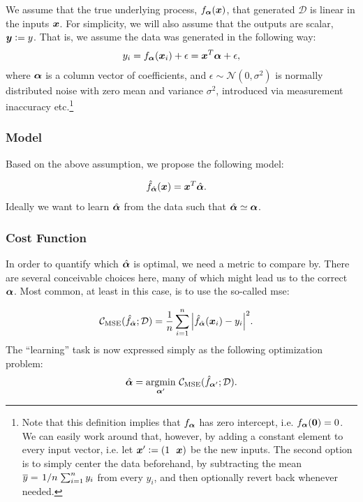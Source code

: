 \documentclass[Thesis.tex]{subfiles}
\begin{document}
We assume that the true underlying process, $f_{\bm{\alpha}}(\bm{x})$, that generated
$\mathcal{D}$ is linear in the inputs $\bm{x}$. For simplicity, we will also
assume that the outputs are scalar, $\bm{y} \vcentcolon= y$. That is, we assume the data
was generated in the following way:
\begin{align}
  y_i = f_{\bm{\alpha}}(\bm{x}_i) + \epsilon = \bm{x}^T\bm{\alpha} + \epsilon,
\end{align}
where $\bm{\alpha}$ is a column vector of coefficients, and
$\epsilon\sim\mathcal{N}(0, \sigma^2)$ is normally distributed noise with zero
mean and variance $\sigma^2$, introduced via measurement inaccuracy
etc.\footnote{Note that this definition implies that $f_{\bm{\alpha}}$
  has zero intercept, i.e. $f_{\bm{\alpha}}(\bm{0}) = 0$. We can easily work around
  that, however, by adding a constant element to every input vector, i.e. let
  $\vx' \defeq (1\ \ \vx)$ be the new inputs. The second option is to simply
  center the data beforehand, by subtracting the mean $\overline y =
  \flatfrac{1}{n}\sum_{i=1}^n y_i$ from every $y_i$, and then optionally revert
  back whenever needed.}

\subsubsection{Model}

Based on the above assumption, we propose the following model:

\begin{align}
\hat f_{\hat{\bm{\alpha}}}(\bm{x}) &= \bm{x}^T\hat{\bm{\alpha}}.
\end{align}
Ideally we want to learn $\hat{\bm{\alpha}}$ from the data such that
$\hat{\bm{\alpha}}\simeq\bm{\alpha}$.

\subsubsection{Cost Function}

In order to quantify which $\hat{\bm{\alpha}}$ is optimal, we need a metric to compare
by. There are several conceivable choices here, many of which might lead us to
the correct $\bm{\alpha}$. Most common, at least in this case, is to use the
so-called \gls{mse}:

\begin{align}
  \mathcal{C}_\text{MSE}(\hat f_{\hat{\bm{\alpha}}}; \mathcal{D}) &= \frac{1}{n}\sum_{i=1}^n \abs{\hat f_{\hat{\bm{\alpha}}}(\bm{x}_i) - y_i}^2.
\end{align}
The ``learning'' task is now expressed simply as the following optimization problem:
\begin{align}
  \label{eq:mse-optimization-problem-example}
  \hat{\bm{\alpha}} = \operatorname*{argmin}_{\bm{\alpha}'}\,\mathcal{C}_\text{MSE}(\hat f_{\bm{\alpha}'}; \mathcal{D}).
\end{align}
\end{document}
